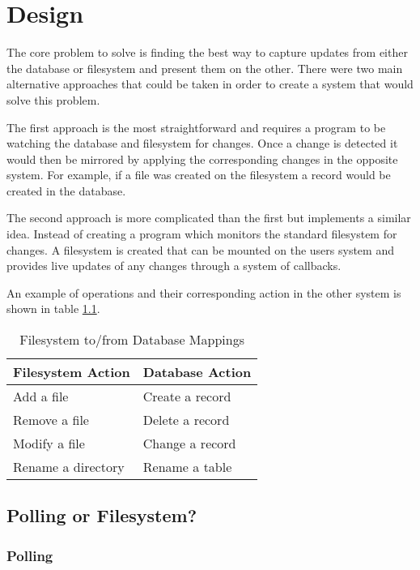 \chapter{Design}

The core problem to solve is finding the best way to capture updates from
either the database or filesystem and present them on the other. There were two
main alternative approaches that could be taken in order to create a system
that would solve this problem.

The first approach is the most straightforward and requires a program to be
watching the database and filesystem for changes. Once a change is detected it
would then be mirrored by applying the corresponding changes in the opposite
system. For example, if a file was created on the filesystem a record would be
created in the database.

The second approach is more complicated than the first but implements a similar
idea. Instead of creating a program which monitors the standard filesystem for
changes. A filesystem is created that can be mounted on the users system and
provides live updates of any changes through a system of callbacks.

An example of operations and their corresponding action in the other system is
shown in table \ref{tbl:mappings}.

\begin{table}
	\centering
	\begin{tabular}{|l|l|}
		\hline
		\textbf{Filesystem Action} & \textbf{Database Action} \\
		\hline
		Add a file & Create a record \\
		Remove a file & Delete a record \\
		Modify a file & Change a record \\
		Rename a directory & Rename a table \\
		\hline
	\end{tabular}
	\caption{Filesystem to/from Database Mappings}
	\label{tbl:mappings}
\end{table}

\section{Polling or Filesystem?}

\subsection{Polling}

